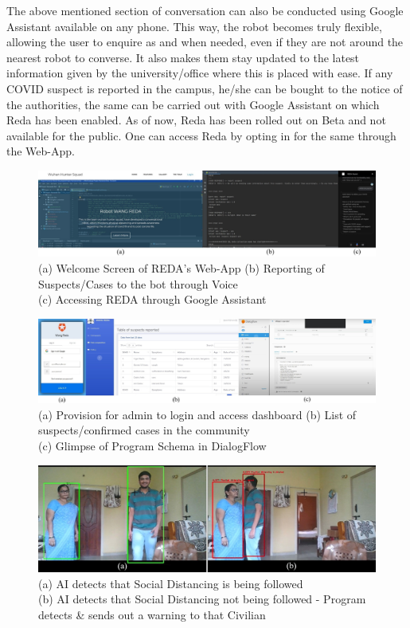\documentclass[AMA,STIX1COL]{WileyNJD-v2}
\begin{document}
The above mentioned section of conversation can also be conducted using Google Assistant available on any phone. This way, the robot becomes truly flexible, allowing the user to enquire as and when needed, even if they are not around the nearest robot to converse. It also makes them stay updated to the latest information given by the university/office where this is placed with ease. If any COVID suspect is reported in the campus, he/she can be bought to the notice of the authorities, the same can be carried out with Google Assistant on which Reda has been enabled. As of now, Reda has been rolled out on Beta and not available for the public. One can access Reda by opting in for the same through the Web-App.

\begin{figure}
\centerline{\includegraphics[width=1\textwidth]{webf.jpeg}}
\captionsetup{justification=centering}
\caption{(a) Welcome Screen of REDA's Web-App  (b) Reporting of Suspects/Cases to the bot through Voice \\(c) Accessing REDA through Google Assistant 
\label{fig5}}
\end{figure}
\begin{figure}
\centerline{\includegraphics[width=1\textwidth]{webd.jpeg}}
\captionsetup{justification=centering}
\caption{(a) Provision for admin to login and access dashboard (b) List of suspects/confirmed cases in the community \\(c) Glimpse of Program Schema in DialogFlow
\label{fig8}}
\end{figure}
\begin{figure}
\centerline{\includegraphics[width=1\textwidth]{sdok.jpeg}}
\captionsetup{justification=centering}
\caption{(a) AI detects that Social Distancing is being followed \\(b) AI detects that Social Distancing not being followed - Program detects \& sends out a warning to that Civilian
\label{fig8}}
\end{figure}
\end{document}
